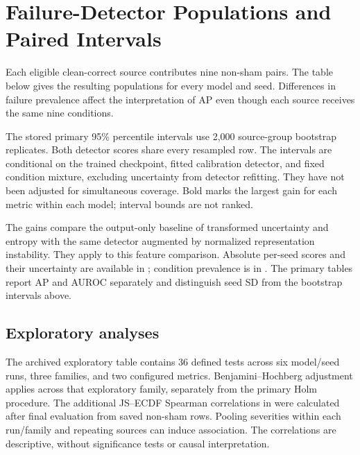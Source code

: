 \section{Failure-Detector Populations and Paired Intervals}\label{app:detector}
Each eligible clean-correct source contributes nine non-sham pairs. The table below gives the resulting populations for every model and seed. Differences in failure prevalence affect the interpretation of AP even though each source receives the same nine conditions.
\begin{center}\end{center}
The stored primary 95\% percentile intervals use 2,000 source-group bootstrap replicates. Both detector scores share every resampled row. The intervals are conditional on the trained checkpoint, fitted calibration detector, and fixed condition mixture, excluding uncertainty from detector refitting. They have not been adjusted for simultaneous coverage. Bold marks the largest gain for each metric within each model; interval bounds are not ranked.
\begin{center}\end{center}
The gains compare the output-only baseline of transformed uncertainty and entropy with the same detector augmented by normalized representation instability. They apply to this feature comparison. Absolute per-seed scores and their uncertainty are available in ; condition prevalence is in . The primary tables report AP and AUROC separately and distinguish seed SD from the bootstrap intervals above.

\subsection{Exploratory analyses}
The archived exploratory table contains 36 defined tests across six model/seed runs, three families, and two configured metrics. Benjamini--Hochberg adjustment applies across that exploratory family, separately from the primary Holm procedure. The additional JS--ECDF Spearman correlations in  were calculated after final evaluation from saved non-sham rows. Pooling severities within each run/family and repeating sources can induce association. The correlations are descriptive, without significance tests or causal interpretation.
